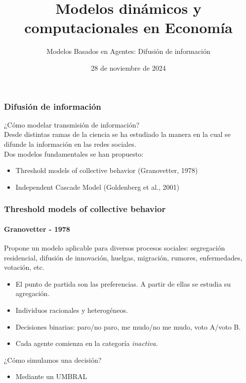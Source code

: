 \documentclass[11pt]{beamer}
\begin{document}
	\title{Modelos dinámicos y computacionales en Economía}
	\subtitle{Modelos Basados en Agentes: Difusión de información}
	\date{28 de noviembre de 2024}




\begin{frame}
	\frametitle{Difusión de información}
	¿Cómo modelar transmisión de información? \\
	\vspace{3mm}
	Desde distintas ramas de la ciencia se ha estudiado la manera en la cual se difunde la información en las redes sociales.\\
	Dos modelos fundamentales se han propuesto:
	\begin{itemize}
		\item Threshold models of collective behavior (Granovetter, 1978)
		\item Independent Cascade Model (Goldenberg et al., 2001)
	\end{itemize}
\end{frame}

\begin{frame}
	\frametitle{Threshold models of collective behavior}
	\framesubtitle{Granovetter - 1978}
	Propone un modelo aplicable para diversos procesos sociales: segregación residencial, difusión de innovación, huelgas, migración, rumores, enfermedades, votación, etc.
	\begin{itemize}
		\item El punto de partida son las preferencias. A partir de ellas se estudia su agregación.
		\item Individuos racionales y heterogéneos.
		\item Decisiones binarias: paro/no paro, me mudo/no me mudo, voto A/voto B.
		\item Cada agente comienza en la categoría \textit{inactiva}.
	\end{itemize}
	\vspace{3mm}
	¿Cómo simulamos una decisión?
	\begin{itemize}
		\item<2-> Mediante un UMBRAL
	\end{itemize}
\end{frame}
\end{document}
